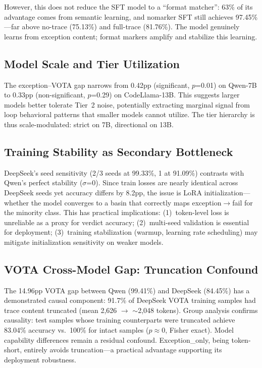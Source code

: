 \documentclass[11pt]{article}
\begin{document}
However, this does not reduce the SFT model to a ``format matcher'': 63\% of its advantage comes from semantic learning, and nomarker SFT still achieves 97.45\%---far above no-trace (75.13\%) and full-trace (81.76\%). The model genuinely learns from exception content; format markers amplify and stabilize this learning.

\subsection{Model Scale and Tier Utilization}

The exception--VOTA gap narrows from 0.42pp (significant, $p$=0.01) on Qwen-7B to 0.33pp (non-significant, $p$=0.29) on CodeLlama-13B. This suggests larger models better tolerate Tier~2 noise, potentially extracting marginal signal from loop behavioral patterns that smaller models cannot utilize. The tier hierarchy is thus scale-modulated: strict on 7B, directional on 13B.

\subsection{Training Stability as Secondary Bottleneck}

DeepSeek's seed sensitivity (2/3 seeds at 99.33\%, 1 at 91.09\%) contrasts with Qwen's perfect stability ($\sigma$=0). Since train losses are nearly identical across DeepSeek seeds yet accuracy differs by 8.2pp, the issue is LoRA initialization---whether the model converges to a basin that correctly maps exception$\rightarrow$fail for the minority class. This has practical implications: (1)~token-level loss is unreliable as a proxy for verdict accuracy; (2)~multi-seed validation is essential for deployment; (3)~training stabilization (warmup, learning rate scheduling) may mitigate initialization sensitivity on weaker models.

\subsection{VOTA Cross-Model Gap: Truncation Confound}

The 14.96pp VOTA gap between Qwen (99.41\%) and DeepSeek (84.45\%) has a demonstrated causal component: 91.7\% of DeepSeek VOTA training samples had trace content truncated (mean 2,626 $\rightarrow$ $\sim$2,048 tokens). Group analysis confirms causality: test samples whose training counterparts were truncated achieve 83.04\% accuracy vs.\ 100\% for intact samples ($p \approx 0$, Fisher exact). Model capability differences remain a residual confound. Exception\_only, being token-short, entirely avoids truncation---a practical advantage supporting its deployment robustness.
\end{document}
